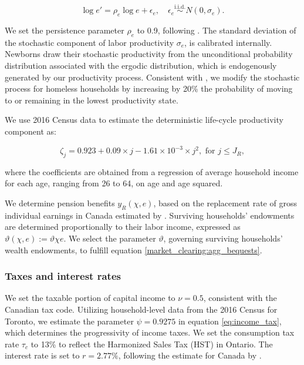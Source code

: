 \documentclass[parskip=full]{article}
\begin{document}
\begin{equation*}
  \log e' = \rho_{e} \log e + \epsilon_{e},\quad \epsilon_{e}\overset{\mathrm{i.i.d.}} \sim N(0,\sigma_{e}).
\end{equation*}

\noindent We set the persistence parameter $\rho_{e}$ to 0.9, following \citet{gkkoc}. The standard deviation of the stochastic component of labor productivity $\sigma_{e}$, is calibrated internally. Newborns draw their stochastic productivity from the unconditional probability distribution associated with the ergodic distribution, which is endogenously generated by our productivity process. Consistent with \citet{az-2024}, we modify the stochastic process for homeless households by increasing by 20\% the probability of moving to or remaining in the lowest productivity state.  

We use 2016 Census data to estimate the deterministic life-cycle productivity component as:

\begin{equation*}
\zeta_j = 0.923+0.09\times j-1.61\times 10^{-3}\times j^{2}, \mbox{ for } j\leq J_{R},
\end{equation*}

\noindent where the coefficients are obtained from a regression of average household income for each age, ranging from 26 to 64, on age and age squared. 

We determine pension benefits ${y_{R}(\chi,e)}$, based on the replacement rate of gross individual earnings in Canada estimated by \citet{OECD-pension}. Surviving households' endowments are determined proportionally to their labor income, expressed as $\vartheta(\chi,e):=\vartheta \chi e$. We select the parameter $\vartheta$, governing surviving households' wealth endowments, to fulfill equation \eqref{market_clearing:agg_bequests}.

\subsubsection{Taxes and interest rates}

We set the taxable portion of capital income to $\nu=0.5$, consistent with the Canadian tax code. Utilizing household-level data from the 2016 Census for Toronto, we estimate the parameter $\psi=0.9275$ in equation \eqref{eq:income_tax}, which determines the progressivity of income taxes. We set the consumption tax rate $\tau_{c}$ to 13\% to reflect the Harmonized Sales Tax (HST) in Ontario. The interest rate is set to $r=2.77\%$, following the estimate for Canada by \citet{bruneau-etal-2018}.
\end{document}
